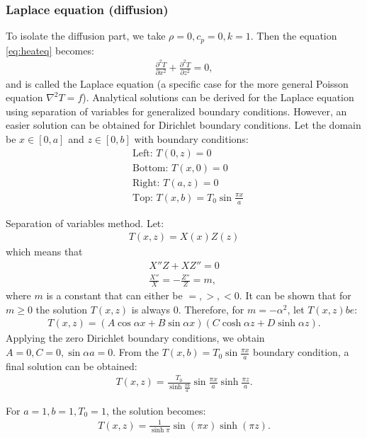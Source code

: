 \documentclass[a4paper,11pt]{article}
\begin{document}
\subsubsection{Laplace equation (diffusion)} \label{laplace}
To isolate the diffusion part, we take $\rho=0, c_p=0, k=1$. Then the equation \ref{eq:heateq} becomes:
\begin{align}
\frac{\partial^2 T}{\partial x^2} + \frac{\partial^2 T}{\partial z^2} = 0,
\end{align}
and is called the Laplace equation (a specific case for the more general Poisson equation $\nabla^2 T=f$). Analytical solutions can be derived for the Laplace equation using separation of variables for generalized boundary conditions. However, an easier solution can be obtained for Dirichlet boundary conditions. Let the domain be $x\in [0,a]$ and $z\in [0,b]$ with boundary conditions:
\begin{align}
&\text{Left: } T(0,z) = 0 \\
&\text{Bottom: } T(x,0) = 0\\
&\text{Right: } T(a,z) = 0\\
&\text{Top: } T(x,b) = T_0\sin\frac{\pi x}{a}
\end{align}

Separation of variables method. Let:
\begin{align}
T(x,z) = X(x)Z(z)
\end{align}
which means that
\begin{align}
X''Z+XZ'' = 0\\
\frac{X''}{X}=-\frac{Z''}{Z} = m,
\end{align}
where $m$ is a constant that can either be $=, >, < 0$. It can be shown that for $m\ge0$ the solution $T(x,z)$ is always 0. Therefore, for $m = -\alpha^2$, let $T(x,z) be$:
\begin{align}
T(x,z) = (A \cos\alpha x +B\sin\alpha x)(C \cosh\alpha z +D\sinh\alpha z).
\end{align}
Applying the zero Dirichlet boundary conditions, we obtain $A = 0, C = 0, \sin\alpha a=0$. From the $T(x,b) = T_0\sin\frac{\pi x}{a}$ boundary condition, a final solution can be obtained:
\begin{align}
T(x,z) = \frac{T_0}{\sinh \frac{\pi b}{a}}\sin\frac{\pi x}{a}\sinh\frac{\pi z}{a}.
\end{align}

For $a=1, b=1, T_0=1$, the solution becomes:
\begin{align}
T(x,z) = \frac{1}{\sinh \pi}\sin(\pi x)\sinh(\pi z).
\end{align}
\end{document}
